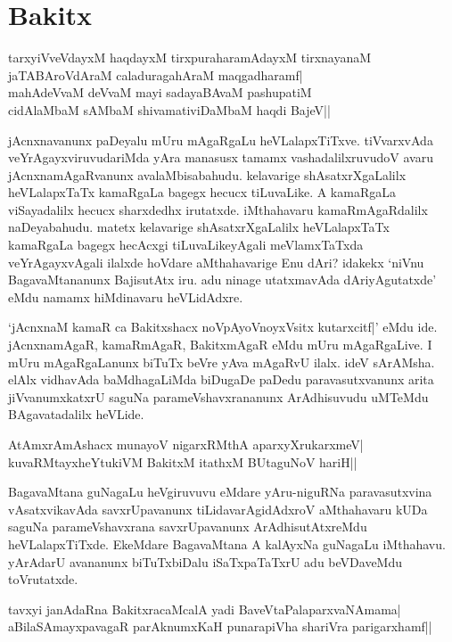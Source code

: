 \chapter{Bakitx}\label{chap2}

\begin{shloka}
tarxyiVveVdayxM haqdayxM tirxpuraharamAdayxM tirxnayanaM\\
jaTABAroVdAraM caladuragahAraM maqgadharamf|\\
mahAdeVvaM deVvaM mayi sadayaBAvaM pashupatiM\\
cidAlaMbaM sAMbaM shivamativiDaMbaM haqdi BajeV||
\end{shloka}

jAcnxnavanunx paDeyalu mUru mAgaRgaLu heVLalapxTiTxve. tiVvarxvAda veYrAgayxviruvudariMda yAra manasusx tamamx vashadalilxruvudoV 
avaru jAcnxnamAgaRvanunx avalaMbisabahudu. kelavarige shAsatxrXgaLalilx heVLalapxTaTx kamaRgaLa bagegx hecucx tiLuvaLike. A kamaRgaLa 
viSayadalilx hecucx sharxdedhx irutatxde. iMthahavaru kamaRmAgaRdalilx naDeyabahudu. matetx kelavarige shAsatxrXgaLalilx heVLalapxTaTx kamaRgaLa bagegx hecAcxgi 
tiLuvaLikeyAgali meVlamxTaTxda veYrAgayxvAgali ilalxde hoVdare aMthahavarige Enu dAri? idakekx `niVnu BagavaMtananunx BajisutAtx iru. adu ninage 
utatxmavAda dAriyAgutatxde' eMdu namamx hiMdinavaru heVLidAdxre.

`jAcnxnaM kamaR ca Bakitxshacx noVpAyoVnoyxV\s sitx kutarxcitf|' eMdu ide. jAcnxnamAgaR, kamaRmAgaR, BakitxmAgaR eMdu mUru 
mAgaRgaLive. I mUru mAgaRgaLanunx biTuTx beVre yAva mAgaRvU ilalx. ideV sArAMsha. elAlx vidhavAda baMdhagaLiMda biDugaDe paDedu 
paravasutxvanunx arita jiVvanumxkatxrU saguNa parameVshavxrananunx ArAdhisuvudu uMTeMdu BAgavatadalilx heVLide.

\begin{shloka}
AtAmxrAmAshacx munayoV nigarxRMthA aparxyXrukarxmeV|\\
kuvaRMtayxheYtukiVM BakitxM itathxM BUtaguNoV hariH||
\end{shloka}

BagavaMtana guNagaLu heVgiruvuvu eMdare yAru-niguRNa paravasutxvina vAsatxvikavAda savxrUpavanunx tiLidavarAgidAdxroV aMthahavaru 
kUDa saguNa parameVshavxrana savxrUpavanunx ArAdhisutAtxreMdu heVLalapxTiTxde. EkeMdare BagavaMtana A kalAyxNa guNagaLu 
iMthahavu. yArAdarU avananunx biTuTxbiDalu iSaTxpaTaTxrU adu beVDaveMdu toVrutatxde.

\begin{shloka}
tavxyi janAdaRna BakitxracaMcalA yadi BaveVtaPalaparxvaNAmama|\\
aBilaSAmayxpavagaR parAknumxKaH punarapiVha shariVra parigarxhamf||
\end{shloka}

